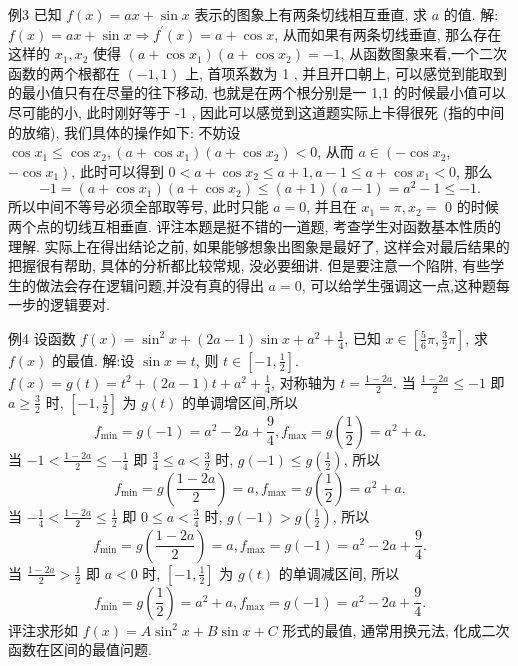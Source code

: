 例3 已知 $f(x)=a x+\sin x$ 表示的图象上有两条切线相互垂直, 求 $a$ 的值.
解:$f(x)=a x+\sin x \Rightarrow f^{\prime}(x)=a+\cos x$, 从而如果有两条切线垂直, 那么存在这样的 $x_1, x_2$ 使得 $\left(a+\cos x_1\right)\left(a+\cos x_2\right)=-1$, 从函数图象来看,一个二次函数的两个根都在 $(-1,1)$ 上, 首项系数为 1 , 并且开口朝上, 可以感觉到能取到的最小值只有在尽量的往下移动, 也就是在两个根分别是一 1,1 的时候最小值可以尽可能的小, 此时刚好等于 -1 , 因此可以感觉到这道题实际上卡得很死 (指的中间的放缩), 我们具体的操作如下:
不妨设 $\cos x_1 \leqslant \cos x_2,\left(a+\cos x_1\right)\left(a+\cos x_2\right)<0$, 从而 $a \in\left(-\cos x_2\right.$, $\left.-\cos x_1\right)$, 此时可以得到 $0<a+\cos x_2 \leqslant a+1, a-1 \leqslant a+\cos x_1<0$, 那么
$$
-1=\left(a+\cos x_1\right)\left(a+\cos x_2\right) \leqslant(a+1)(a-1)=a^2-1 \leqslant-1 .
$$
所以中间不等号必须全部取等号, 此时只能 $a=0$, 并且在 $x_1=\pi, x_2=$ 0 的时候两个点的切线互相垂直.
评注本题是挺不错的一道题, 考查学生对函数基本性质的理解.
实际上在得出结论之前, 如果能够想象出图象是最好了, 这样会对最后结果的把握很有帮助, 具体的分析都比较常规, 没必要细讲.
但是要注意一个陷阱, 有些学生的做法会存在逻辑问题,并没有真的得出 $a=0$, 可以给学生强调这一点,这种题每一步的逻辑要对.



例4 设函数 $f(x)=\sin ^2 x+(2 a-1) \sin x+a^2+\frac{1}{4}$, 已知 $x \in \left[\frac{5}{6} \pi, \frac{3}{2} \pi\right]$, 求 $f(x)$ 的最值.
解:设 $\sin x=t$, 则 $t \in\left[-1, \frac{1}{2}\right]$.
$f(x)=g(t)=t^2+(2 a-1) t+a^2+\frac{1}{4}$, 对称轴为 $t=\frac{1-2 a}{2}$.
当 $\frac{1-2 a}{2} \leqslant-1$ 即 $a \geqslant \frac{3}{2}$ 时, $\left[-1, \frac{1}{2}\right]$ 为 $g(t)$ 的单调增区间,所以
$$
f_{\min }=g(-1)=a^2-2 a+\frac{9}{4}, f_{\max }=g\left(\frac{1}{2}\right)=a^2+a .
$$
当 $-1<\frac{1-2 a}{2} \leqslant-\frac{1}{4}$ 即 $\frac{3}{4} \leqslant a<\frac{3}{2}$ 时, $g(-1) \leqslant g\left(\frac{1}{2}\right)$, 所以
$$
f_{\min }=g\left(\frac{1-2 a}{2}\right)=a, f_{\max }=g\left(\frac{1}{2}\right)=a^2+a .
$$
当 $-\frac{1}{4}<\frac{1-2 a}{2} \leqslant \frac{1}{2}$ 即 $0 \leqslant a<\frac{3}{4}$ 时, $g(-1)>g\left(\frac{1}{2}\right)$, 所以
$$
f_{\min }=g\left(\frac{1-2 a}{2}\right)=a, f_{\max }=g(-1)=a^2-2 a+\frac{9}{4} .
$$
当 $\frac{1-2 a}{2}>\frac{1}{2}$ 即 $a<0$ 时, $\left[-1, \frac{1}{2}\right]$ 为 $g(t)$ 的单调减区间, 所以
$$
f_{\min }=g\left(\frac{1}{2}\right)=a^2+a, f_{\max }=g(-1)=a^2-2 a+\frac{9}{4} .
$$
评注求形如 $f(x)=A \sin ^2 x+B \sin x+C$ 形式的最值, 通常用换元法, 化成二次函数在区间的最值问题.



